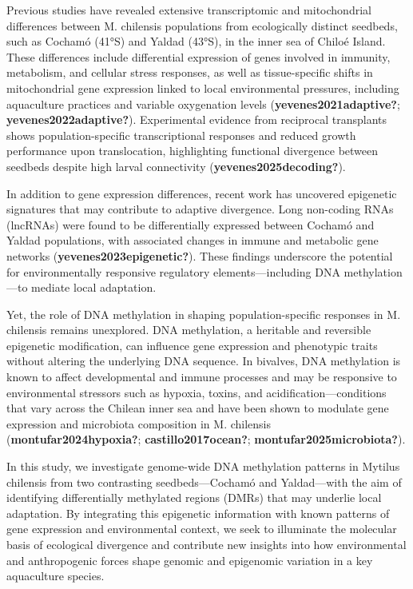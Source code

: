 \documentclass[
]{agujournal2019}
\begin{document}
Previous studies have revealed extensive transcriptomic and
mitochondrial differences between M. chilensis populations from
ecologically distinct seedbeds, such as Cochamó (41°S) and Yaldad
(43°S), in the inner sea of Chiloé Island. These differences include
differential expression of genes involved in immunity, metabolism, and
cellular stress responses, as well as tissue-specific shifts in
mitochondrial gene expression linked to local environmental pressures,
including aquaculture practices and variable oxygenation levels
(\textbf{yevenes2021adaptive?}; \textbf{yevenes2022adaptive?}).
Experimental evidence from reciprocal transplants shows
population-specific transcriptional responses and reduced growth
performance upon translocation, highlighting functional divergence
between seedbeds despite high larval connectivity
(\textbf{yevenes2025decoding?}).

In addition to gene expression differences, recent work has uncovered
epigenetic signatures that may contribute to adaptive divergence. Long
non-coding RNAs (lncRNAs) were found to be differentially expressed
between Cochamó and Yaldad populations, with associated changes in
immune and metabolic gene networks (\textbf{yevenes2023epigenetic?}).
These findings underscore the potential for environmentally responsive
regulatory elements---including DNA methylation---to mediate local
adaptation.

Yet, the role of DNA methylation in shaping population-specific
responses in M. chilensis remains unexplored. DNA methylation, a
heritable and reversible epigenetic modification, can influence gene
expression and phenotypic traits without altering the underlying DNA
sequence. In bivalves, DNA methylation is known to affect developmental
and immune processes and may be responsive to environmental stressors
such as hypoxia, toxins, and acidification---conditions that vary across
the Chilean inner sea and have been shown to modulate gene expression
and microbiota composition in M. chilensis
(\textbf{montufar2024hypoxia?}; \textbf{castillo2017ocean?};
\textbf{montufar2025microbiota?}).

In this study, we investigate genome-wide DNA methylation patterns in
Mytilus chilensis from two contrasting seedbeds---Cochamó and
Yaldad---with the aim of identifying differentially methylated regions
(DMRs) that may underlie local adaptation. By integrating this
epigenetic information with known patterns of gene expression and
environmental context, we seek to illuminate the molecular basis of
ecological divergence and contribute new insights into how environmental
and anthropogenic forces shape genomic and epigenomic variation in a key
aquaculture species.
\end{document}
